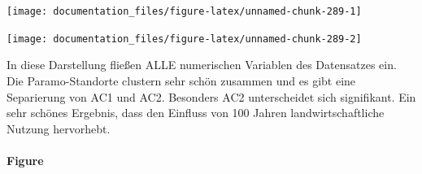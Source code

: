 \documentclass[
]{article}
\newenvironment{Shaded}{\begin{snugshade}}{\end{snugshade}}
\newcommand{\AttributeTok}[1]{\textcolor[rgb]{0.77,0.63,0.00}{#1}}
\newcommand{\CommentTok}[1]{\textcolor[rgb]{0.56,0.35,0.01}{\textit{#1}}}
\newcommand{\ConstantTok}[1]{\textcolor[rgb]{0.00,0.00,0.00}{#1}}
\newcommand{\FunctionTok}[1]{\textcolor[rgb]{0.00,0.00,0.00}{#1}}
\newcommand{\NormalTok}[1]{#1}
\newcommand{\SpecialCharTok}[1]{\textcolor[rgb]{0.00,0.00,0.00}{#1}}
\newcommand{\StringTok}[1]{\textcolor[rgb]{0.31,0.60,0.02}{#1}}
\begin{document}
\begin{center}\texttt{[image: documentation\_files/figure-latex/unnamed-chunk-289-1]} \end{center}

\begin{Shaded}
\end{Shaded}

\begin{center}\texttt{[image: documentation\_files/figure-latex/unnamed-chunk-289-2]} \end{center}

In diese Darstellung fließen ALLE numerischen Variablen des Datensatzes ein. Die Paramo-Standorte clustern sehr schön zusammen und es gibt eine Separierung von AC1 und AC2. Besonders AC2 unterscheidet sich signifikant. Ein sehr schönes Ergebnis, dass den Einfluss von 100 Jahren landwirtschaftliche Nutzung hervorhebt.

\hypertarget{figure}{%
\paragraph{Figure}\label{figure}}
\end{document}
